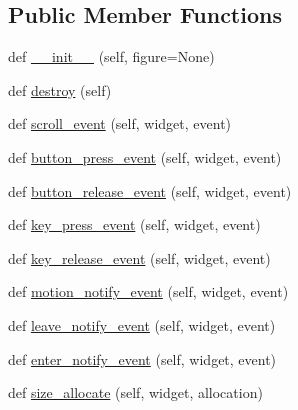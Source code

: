 \subsection*{Public Member Functions}
\begin{DoxyCompactItemize}
\item 
def \hyperlink{classmatplotlib_1_1backends_1_1backend__gtk3_1_1FigureCanvasGTK3_ae6d7cf4e39d78735fc3a76d8eb5cbce4}{\+\_\+\+\_\+init\+\_\+\+\_\+} (self, figure=None)
\item 
def \hyperlink{classmatplotlib_1_1backends_1_1backend__gtk3_1_1FigureCanvasGTK3_ae48ec2bac10d14cf41eff0e2dbe22691}{destroy} (self)
\item 
def \hyperlink{classmatplotlib_1_1backends_1_1backend__gtk3_1_1FigureCanvasGTK3_a84791c63b1aa73f60e9b7fe66b841de2}{scroll\+\_\+event} (self, widget, event)
\item 
def \hyperlink{classmatplotlib_1_1backends_1_1backend__gtk3_1_1FigureCanvasGTK3_a5aa32cd42455b2c779040606e799f580}{button\+\_\+press\+\_\+event} (self, widget, event)
\item 
def \hyperlink{classmatplotlib_1_1backends_1_1backend__gtk3_1_1FigureCanvasGTK3_a2f077214a1f7166431f07a61ce1d5abb}{button\+\_\+release\+\_\+event} (self, widget, event)
\item 
def \hyperlink{classmatplotlib_1_1backends_1_1backend__gtk3_1_1FigureCanvasGTK3_a6a000bb670c3fd89b227aa1a71f86893}{key\+\_\+press\+\_\+event} (self, widget, event)
\item 
def \hyperlink{classmatplotlib_1_1backends_1_1backend__gtk3_1_1FigureCanvasGTK3_a1d1f2644a65e96620b72e674e6577411}{key\+\_\+release\+\_\+event} (self, widget, event)
\item 
def \hyperlink{classmatplotlib_1_1backends_1_1backend__gtk3_1_1FigureCanvasGTK3_a213f170ecaabf18247278aaea996e8dc}{motion\+\_\+notify\+\_\+event} (self, widget, event)
\item 
def \hyperlink{classmatplotlib_1_1backends_1_1backend__gtk3_1_1FigureCanvasGTK3_ade9441e3c38141f4f6f5e37b6faa989f}{leave\+\_\+notify\+\_\+event} (self, widget, event)
\item 
def \hyperlink{classmatplotlib_1_1backends_1_1backend__gtk3_1_1FigureCanvasGTK3_a7b7a1b185229425507af8064282f8477}{enter\+\_\+notify\+\_\+event} (self, widget, event)
\item 
def \hyperlink{classmatplotlib_1_1backends_1_1backend__gtk3_1_1FigureCanvasGTK3_aae819bf0736dab8288ed85d28e7151ca}{size\+\_\+allocate} (self, widget, allocation)
\item 

\end{DoxyCompactItemize}

